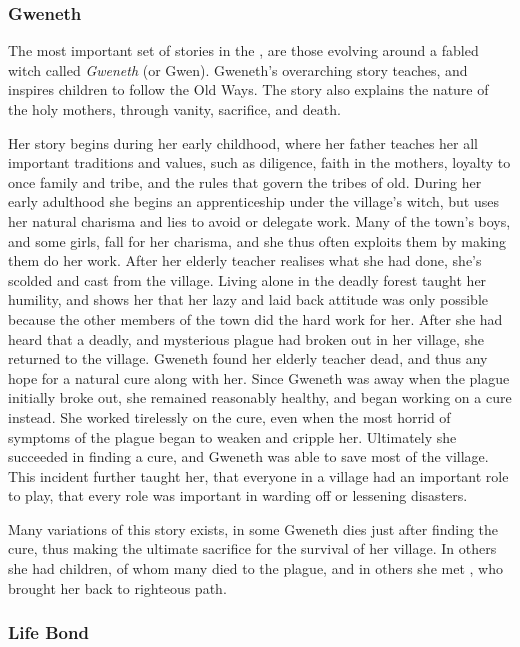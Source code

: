 \subsubsection{Gweneth}
\label{sec:Gweneth}

The most important set of stories in the , are those
evolving around a fabled witch called \emph{Gweneth} (or Gwen). Gweneth's
overarching story teaches, and inspires children to follow the Old Ways. The
story also explains the nature of the holy mothers, through vanity, sacrifice,
and death.

Her story begins during her early childhood, where her father teaches her all
important traditions and values, such as diligence, faith in the mothers,
loyalty to once family and tribe, and the rules that govern the tribes of
old. During her early adulthood she begins an apprenticeship under the
village's witch, but uses her natural charisma and lies to avoid or delegate
work. Many of the town's boys, and some girls, fall for her charisma, and she
thus often exploits them by making them do her work.  After her elderly
teacher realises what she had done, she's scolded and cast from the
village. Living alone in the deadly forest taught her humility, and shows her
that her lazy and laid back attitude was only possible because the other
members of the town did the hard work for her. After she had heard that a
deadly, and mysterious plague had broken out in her village, she returned to
the village. Gweneth found her elderly teacher dead, and thus any hope for a
natural cure along with her. Since Gweneth was away when the plague initially
broke out, she remained reasonably healthy, and began working on a cure
instead. She worked tirelessly on the cure, even when the most horrid of
symptoms of the plague began to weaken and cripple her. Ultimately she
succeeded in finding a cure, and Gweneth was able to save most of the village.
This incident further taught her, that everyone in a village had an important
role to play, that every role was important in warding off or lessening
disasters.

Many variations of this story exists, in some Gweneth dies just after finding
the cure, thus making the ultimate sacrifice for the survival of her
village. In others she had children, of whom many died to the plague, and in
others she met , who brought her back to righteous
path.

\subsubsection{Life Bond}
\label{sec:Life Bond}

